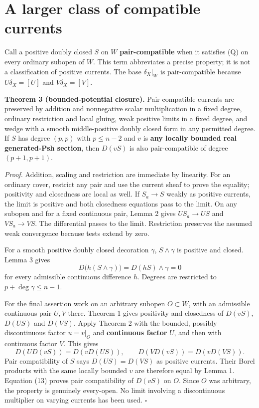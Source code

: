\documentclass[
  11pt,
]{article}
\begin{document}
\section{A larger class of compatible
currents}\label{a-larger-class-of-compatible-currents}

Call a positive doubly closed \(S\) on \(W\) \textbf{pair-compatible}
when it satisfies (Q) on every ordinary subopen of \(W\). This term
abbreviates a precise property; it is not a classification of positive
currents. The base \(\delta_X|_W\) is pair-compatible because
\(U\delta_X=[U]\) and \(V\delta_X=[V]\).

\textbf{Theorem 3 (bounded-potential closure).} Pair-compatible currents
are preserved by addition and nonnegative scalar multiplication in a
fixed degree, ordinary restriction and local gluing, weak positive
limits in a fixed degree, and wedge with a smooth middle-positive doubly
closed form in any permitted degree. If \(S\) has degree \((p,p)\) with
\(p\leq n-2\) and \(v\) is \textbf{any locally bounded real
generated-Psh section}, then \(D(vS)\) is also pair-compatible of degree
\((p+1,p+1)\).

\emph{Proof.} Addition, scaling and restriction are immediate by
linearity. For an ordinary cover, restrict any pair and use the current
sheaf to prove the equality; positivity and closedness are local as
well. If \(S_a\to S\) weakly as positive currents, the limit is positive
and both closedness equations pass to the limit. On any subopen and for
a fixed continuous pair, Lemma 2 gives \(US_a\to US\) and
\(VS_a\to VS\). The differential passes to the limit. Restriction
preserves the assumed weak convergence because tests extend by zero.

For a smooth positive doubly closed decoration \(\gamma\),
\(S\wedge\gamma\) is positive and closed. Lemma 3 gives
\[D\bigl(h(S\wedge\gamma)\bigr)=D(hS)\wedge\gamma=0\] for every
admissible continuous difference \(h\). Degrees are restricted to
\(p+\deg\gamma\leq n-1\).

For the final assertion work on an arbitrary subopen \(O\subset W\),
with an admissible continuous pair \(U,V\) there. Theorem 1 gives
positivity and closedness of \(D(vS)\), \(D(US)\) and \(D(VS)\). Apply
Theorem 2 with the bounded, possibly discontinuous factor \(u=v|_O\) and
\textbf{continuous factor} \(U\), and then with continuous factor \(V\).
This gives \[
 D(UD(vS))=D(vD(US)),\qquad
 D(VD(vS))=D(vD(VS)).                                        \tag{13}
\] Pair compatibility of \(S\) says \(D(US)=D(VS)\) as positive
currents. Their Borel products with the same locally bounded \(v\) are
therefore equal by Lemma 1. Equation (13) proves pair compatibility of
\(D(vS)\) on \(O\). Since \(O\) was arbitrary, the property is genuinely
every-open. No limit involving a discontinuous multiplier on varying
currents has been used. \(\square\)
\end{document}
